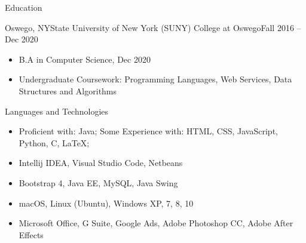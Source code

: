 \documentclass[]{johnsoncv}
\begin{document}
	\makeheader
	
	
	\begin{cvsection}{Education}
		\begin{cvsubsection}{Oswego, NY}{State University of New York (SUNY) College at Oswego}{Fall 2016 – Dec 2020}
			\begin{itemize}
				\item B.A in Computer Science, Dec 2020
				\item Undergraduate Coursework: Programming Languages, Web Services, Data Structures and Algorithms
			\end{itemize}
		\end{cvsubsection}
	\end{cvsection}

	\begin{cvsection}{Languages and Technologies}
		\begin{cvsubsection}{}{}{}	
			\begin{itemize}
				\item Proficient with: Java; Some Experience with: HTML, CSS, JavaScript, Python, C, LaTeX;
				\item Intellij IDEA, Visual Studio Code, Netbeans
				\item Bootstrap 4, Java EE, MySQL, Java Swing 
				\item macOS, Linux (Ubuntu), Windows XP, 7, 8, 10
				\item Microsoft Office, G Suite, Google Ads, Adobe Photoshop CC, Adobe After Effects
			\end{itemize}
		\end{cvsubsection}
	\end{cvsection}

\end{document}
